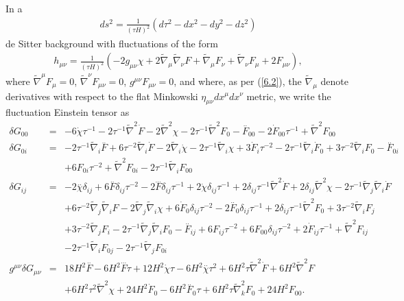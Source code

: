 \documentclass[aps,onecolumn,10pt]{revtex4}
\numberwithin{equation}{section}
\numberwithin{equation}{section}
\begin{document}
In a 
%
\begin{align}
ds^2=\frac{1}{(\tau H)^2}(d\tau^2-dx^2-dy^2-dz^2)
\label{6.50}
\end{align}
%
de Sitter background with fluctuations of the form 
%
\begin{align}
h_{\mu\nu}=\frac{1}{(\tau H)^2}(-2g_{\mu\nu}\chi+2\tilde{\nabla}_{\mu}\tilde{\nabla}_{\nu}F
+ \tilde{\nabla}_{\mu}F_{\nu}+\tilde{\nabla}_{\nu}F_{\mu}+2F_{\mu\nu}), 
\label{6.51}
\end{align}
%
where $\tilde{\nabla}^{\mu}F_{\mu}=0$, $\tilde{\nabla}^{\nu}F_{\mu\nu}=0$, $g^{\mu\nu}F_{\mu\nu}=0$, and where, as per (\ref{6.2}), the $\tilde{\nabla}_{\mu}$ denote derivatives with respect to the flat Minkowski $\eta_{\mu\nu}dx^{\mu}dx^{\nu}$ metric, we write the fluctuation Einstein tensor as 
%
\begin{eqnarray}
\delta G_{00}&=& -6 \dot{\chi} \tau^{-1} - 2 \tau^{-1} \tilde{\nabla}^2\dot{F} - 2 \tilde{\nabla}^2\chi -2 \tau^{-1} \tilde{\nabla}^2F_{0}- \overset{..}{F}_{00} - 2 \dot{F}_{00} \tau^{-1} + \tilde{\nabla}^2F_{00}
\nonumber\\ 
\delta G_{0i}&=& -2 \tau^{-1} \tilde{\nabla}_{i}\overset{..}{F} + 6 \tau^{-2} \tilde{\nabla}_{i}\dot{F} - 2 \tilde{\nabla}_{i}\dot{\chi} - 2 \tau^{-1} \tilde{\nabla}_{i}\chi +3 \dot{F}_{i} \tau^{-2} - 2 \tau^{-1} \tilde{\nabla}_{i}\dot{F}_{0} + 3 \tau^{-2} \tilde{\nabla}_{i}F_{0}- \overset{..}{F}_{0i} \nonumber \\ 
&& + 6 F_{0i} \tau^{-2} +  \tilde{\nabla}^2F_{0i} - 2 \tau^{-1} \tilde{\nabla}_{i}F_{00}
\nonumber\\ 
\delta G_{ij}&=& -2 \overset{..}{\chi}\delta_{ij} + 6 \overset{..}{F}\delta_{ij} \tau^{-2} - 2 \overset{...}{F}\delta_{ij} \tau^{-1} + 2 \dot{\chi}\delta_{ij} \tau^{-1} + 2\delta_{ij} \tau^{-1} \tilde{\nabla}^2\dot{F} + 2\delta_{ij} \tilde{\nabla}^2\chi - 2 \tau^{-1} \tilde{\nabla}_{j}\tilde{\nabla}_{i}\dot{F} 
\nonumber \\ 
&& + 6 \tau^{-2} \tilde{\nabla}_{j}\tilde{\nabla}_{i}F - 2 \tilde{\nabla}_{j}\tilde{\nabla}_{i}\chi +6 \dot{F}_{0}\delta_{ij} \tau^{-2} - 2 \overset{..}{F}_{0}\delta_{ij} \tau^{-1} + 2\delta_{ij} \tau^{-1} \tilde{\nabla}^2F_{0} + 3 \tau^{-2} \tilde{\nabla}_{i}F_{j} 
\nonumber \\ 
&& + 3 \tau^{-2} \tilde{\nabla}_{j}F_{i} - 2 \tau^{-1} \tilde{\nabla}_{j}\tilde{\nabla}_{i}F_{0}- \overset{..}{F}_{ij} + 6 F_{ij} \tau^{-2} + 6 F_{00}\delta_{ij} \tau^{-2} +2 \dot{F}_{ij} \tau^{-1} +\tilde{\nabla}^2F_{ij}
 \nonumber \\ 
&& - 2 \tau^{-1} \tilde{\nabla}_{i}F_{0j} - 2 \tau^{-1} \tilde{\nabla}_{j}F_{0i}
\nonumber\\
g^{\mu\nu}\delta G_{\mu\nu} &=& 18 H^2 \overset{..}{F} - 6 H^2 \overset{...}{F} \tau + 12 H^2 \dot{\chi} \tau - 6 H^2 \overset{..}{\chi} \tau^2 + 6 H^2 \tau \tilde{\nabla}^2\dot{F} + 6 H^2 \tilde{\nabla}^2F 
\nonumber \\ 
&& + 6 H^2 \tau^2 \tilde{\nabla}^2\chi +24 H^2 \dot{F}_{0} - 6 H^2 \overset{..}{F}_{0} \tau + 6 H^2 \tau \tilde{\nabla}_{k}^2F_{0}+24 H^2 F_{00}.
\label{6.52}
\end{eqnarray}
\end{document}
